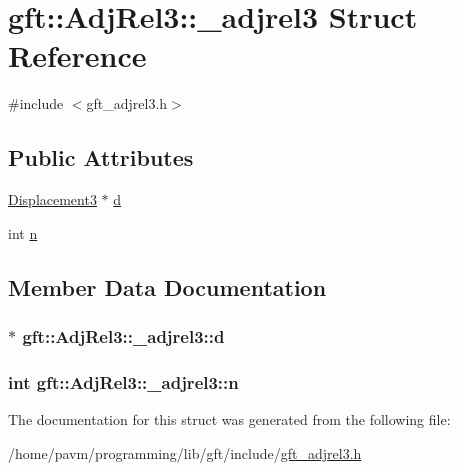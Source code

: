 \hypertarget{structgft_1_1AdjRel3_1_1__adjrel3}{\section{gft\-:\-:Adj\-Rel3\-:\-:\-\_\-adjrel3 Struct Reference}
\label{structgft_1_1AdjRel3_1_1__adjrel3}
}


{\ttfamily \#include $<$gft\-\_\-adjrel3.\-h$>$}

\subsection*{Public Attributes}
\begin{DoxyCompactItemize}
\item 
\hyperlink{namespacegft_1_1AdjRel3_a8939e0d3e5e0afd8c4e28e4b400de74e}{Displacement3} $\ast$ \hyperlink{structgft_1_1AdjRel3_1_1__adjrel3_acd7e5595a9288f4f7c73970ecb26e74d}{d}
\item 
int \hyperlink{structgft_1_1AdjRel3_1_1__adjrel3_a80640ea855cda065bb29facdfad616f9}{n}
\end{DoxyCompactItemize}


\subsection{Member Data Documentation}
\hypertarget{structgft_1_1AdjRel3_1_1__adjrel3_acd7e5595a9288f4f7c73970ecb26e74d}{
\subsubsection[{d}]{$\ast$ gft\-::\-Adj\-Rel3\-::\-\_\-adjrel3\-::d}}\label{structgft_1_1AdjRel3_1_1__adjrel3_acd7e5595a9288f4f7c73970ecb26e74d}
\hypertarget{structgft_1_1AdjRel3_1_1__adjrel3_a80640ea855cda065bb29facdfad616f9}{
\subsubsection[{n}]{\setlength{\rightskip}{0pt plus 5cm}int gft\-::\-Adj\-Rel3\-::\-\_\-adjrel3\-::n}}\label{structgft_1_1AdjRel3_1_1__adjrel3_a80640ea855cda065bb29facdfad616f9}


The documentation for this struct was generated from the following file\-:\begin{DoxyCompactItemize}
\item 
/home/pavm/programming/lib/gft/include/\hyperlink{gft__adjrel3_8h}{gft\-\_\-adjrel3.\-h}\end{DoxyCompactItemize}

